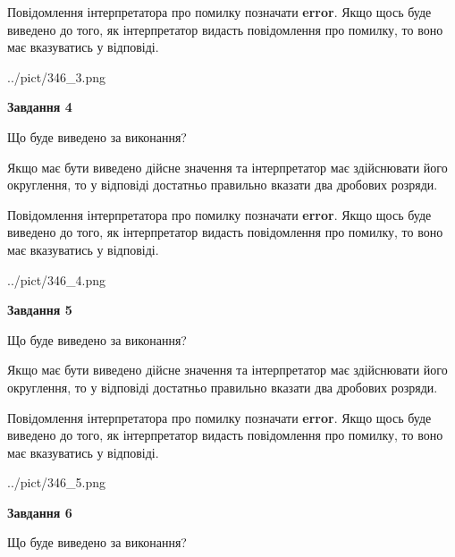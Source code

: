 \documentclass[12pt, ukrainian]{article}
\begin{document}
{\begin {Large}
Повідомлення інтерпретатора про помилку позначати \textbf{error}.
Якщо щось буде виведено до того, як інтерпретатор видасть повідомлення про помилку, 
то воно має вказуватись у відповіді. \par

\begin{center}
	{../pict/346_3.png}
\end{center}
\newpage

{\begin {center}\textbf{Завдання 4}\end {center}}\par
Що буде виведено за виконання? \par

Якщо має бути виведено дійсне значення та інтерпретатор має здійснювати його округлення, 
то у відповіді достатньо правильно вказати два дробових розряди.

Повідомлення інтерпретатора про помилку позначати \textbf{error}.
Якщо щось буде виведено до того, як інтерпретатор видасть повідомлення про помилку, 
то воно має вказуватись у відповіді. \par

\begin{center}
	{../pict/346_4.png}
\end{center}
\newpage

{\begin {center}\textbf{Завдання 5}\end {center}}\par
Що буде виведено за виконання? \par

Якщо має бути виведено дійсне значення та інтерпретатор має здійснювати його округлення, 
то у відповіді достатньо правильно вказати два дробових розряди.

Повідомлення інтерпретатора про помилку позначати \textbf{error}.
Якщо щось буде виведено до того, як інтерпретатор видасть повідомлення про помилку, 
то воно має вказуватись у відповіді. \par

\begin{center}
	{../pict/346_5.png}
\end{center}
\newpage

{\begin {center}\textbf{Завдання 6}\end {center}}\par
Що буде виведено за виконання? \par


\end{Large}}
\end{document}
